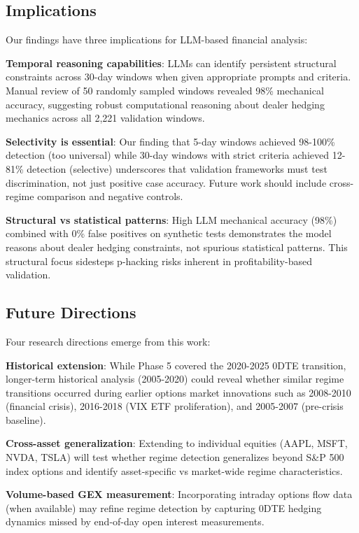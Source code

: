 \subsection{Implications}

Our findings have three implications for LLM-based financial analysis:

\textbf{Temporal reasoning capabilities}: LLMs can identify persistent structural constraints across 30-day windows when given appropriate prompts and criteria. Manual review of 50 randomly sampled windows revealed 98\% mechanical accuracy, suggesting robust computational reasoning about dealer hedging mechanics across all 2,221 validation windows.

\textbf{Selectivity is essential}: Our finding that 5-day windows achieved 98-100\% detection (too universal) while 30-day windows with strict criteria achieved 12-81\% detection (selective) underscores that validation frameworks must test discrimination, not just positive case accuracy. Future work should include cross-regime comparison and negative controls.

\textbf{Structural vs statistical patterns}: High LLM mechanical accuracy (98\%) combined with 0\% false positives on synthetic tests demonstrates the model reasons about dealer hedging constraints, not spurious statistical patterns. This structural focus sidesteps p-hacking risks inherent in profitability-based validation.

\subsection{Future Directions}

Four research directions emerge from this work:

\textbf{Historical extension}: While Phase 5 covered the 2020-2025 0DTE transition, longer-term historical analysis (2005-2020) could reveal whether similar regime transitions occurred during earlier options market innovations such as 2008-2010 (financial crisis), 2016-2018 (VIX ETF proliferation), and 2005-2007 (pre-crisis baseline).

\textbf{Cross-asset generalization}: Extending to individual equities (AAPL, MSFT, NVDA, TSLA) will test whether regime detection generalizes beyond S\&P 500 index options and identify asset-specific vs market-wide regime characteristics.

\textbf{Volume-based GEX measurement}: Incorporating intraday options flow data (when available) may refine regime detection by capturing 0DTE hedging dynamics missed by end-of-day open interest measurements.

